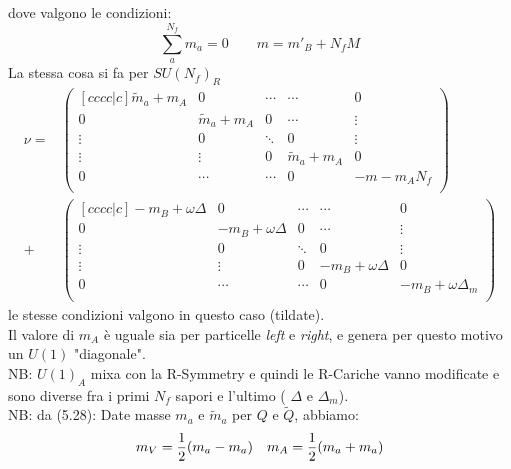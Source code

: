 \documentclass[a4paper,12pt]{article}
\begin{document}
dove valgono le condizioni:
$$
\sum_a^{N_f} m_a = 0 \qquad  m = m'_B + N_f M 
$$
La stessa cosa si fa per $SU(N_f)_R$ 
\begin{align*}
\nu = &
\begin{pmatrix}[c c c c|c]
		\tilde m_a + m_A 	& 0 		& \cdots 	& \cdots 	& 0 \\
		0 			 & \tilde m_a + m_A 	& 0 &\cdots & \vdots \\
		\vdots 		& 0 		& \ddots & 0 & \vdots \\
		\vdots & \vdots & 0 & \tilde m_a + m_A 	 & 0 \\
		\hline 
		0 & \cdots & \cdots & 0 & -m  - m_A N_f\\
\end{pmatrix} \\
+ & 
\begin{pmatrix}[c c c c|c]
		- m_B + \omega \Delta 	& 0 		& \cdots 	& \cdots 	& 0 \\
		0 			 & - m_B + \omega \Delta  & 0 &\cdots & \vdots \\
		\vdots 		& 0 		& \ddots & 0 & \vdots \\
		\vdots & \vdots & 0 & - m_B + \omega \Delta & 0 \\
		\hline 
		0 & \cdots & \cdots & 0 & -m_B + \omega \Delta_m\\
\end{pmatrix}
\end{align*}
le stesse condizioni valgono in questo caso (tildate).\\
Il valore di $m_A$ è uguale sia per particelle \emph{left} e \emph{right}, e genera per questo motivo un $U(1)$ "diagonale".\\
NB: $U(1)_A$ mixa con la R-Symmetry e quindi le R-Cariche vanno modificate e sono diverse fra i primi $N_f$ sapori e l'ultimo ( $\Delta $ e $\Delta_m$).\\

NB: da \citep{Aharony:2013dha} (5.28):
Date masse $m_a$ e $\tilde m_a$ per $Q$ e $\tilde{Q}$, abbiamo:
$$
	m_V = {1 \over 2 }( m_a -  m_a) \quad m_A = {1 \over 2 }( m_a + m_a)
$$
\end{document}
